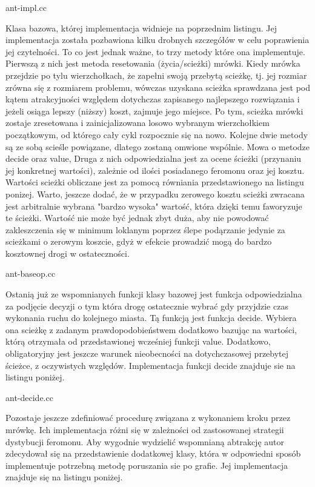 \documentclass[polish,polish,a4paper]{article}
\begin{document}

{ant-impl.cc}

Klasa bazowa, której implementacja widnieje na poprzednim listingu. Jej implementacja została pozbawiona kilku drobnych szczegółów w celu poprawienia
jej czytelności. To co jest jednak ważne, to trzy metody które ona implementuje.
Pierwszą z nich jest metoda resetowania (życia/scieżki) mrówki. Kiedy mrówka przejdzie po tylu wierzchołkach, że zapełni swoją przebytą scieżkę, tj.
jej rozmiar zrówna się z rozmiarem problemu, wówczas uzyskana scieżka sprawdzana jest pod kątem atrakcyjności względem dotychczas zapisanego
najlepszego rozwiązania i jeżeli osiąga lepszy (niższy) koszt, zajmuje jego miejsce. Po tym, scieżka mrówki zostaje zresetowana i zainicjalizowana
losowo wybranym wierzchołkiem początkowym, od którego cały cykl rozpocznie się na nowo.
Kolejne dwie metody są ze sobą scieśle powiązane, dlatego zostaną omwione wspólnie. Mowa o metodze decide oraz value, Druga z nich odpowiedzialna
jest za ocene ścieżki (przynaniu jej konkretnej wartości), zależnie od ilości posiadanego feromonu oraz jej kosztu. Wartości scieżki obliczane jest 
za pomocą równiania przedstawionego na listingu ponizej. Warto, jeszcze dodać, że w przypadku zerowego kosztu scieżki zwracana jest arbitralnie wybrana
"bardzo wysoka" wartość, która dzięki temu faworyzuje te ścieżki. Wartość nie może być jednak zbyt duża, aby nie powodować zakleszczenia się w minimum
loklanym poprzez ślepe podąrzanie jedynie za scieżkami o zerowym koszcie, gdyż w efekcie prowadzić mogą do bardzo kosztownej drogi w ostateczności.


{ant-baseop.cc}

Ostanią już ze wspomnianych funkcji klasy bazowej jest funkcja odpowiedzialna za podjęcie decyzji o tym która drogę ostatecznie wybrać gdy przyjdzie
czas wykonania ruchu do kolejnego miasta. Tą funkcją jest funkcja decide. Wybiera ona scieżkę z zadanym prawdopodobieństwem dodatkowo bazując na wartości,
którą otrzymała od przedstawionej wcześniej funkcji value. Dodatkowo, obligatoryjny jest jeszcze warunek nieobecności na dotychczasowej przebytej ścieżce,
z oczywistych względów. Implementacja funkcji decide znajduje sie na listingu poniżej.


{ant-decide.cc}

Pozostaje jeszcze zdefiniować procedurę związana z wykonaniem kroku przez mrówkę. Ich implementacja różni się w zależności od zastosowanej strategii
dystybucji feromonu. Aby wygodnie wydzielić wspomnianą abtrakcję autor zdecydował się na przedstawienie dodatkowej klasy, która w odpowiedni sposób
implementuje potrzebną metodę poruszania sie po grafie. Jej implementacja znajduje się na listingu poniżej.
\end{document}
